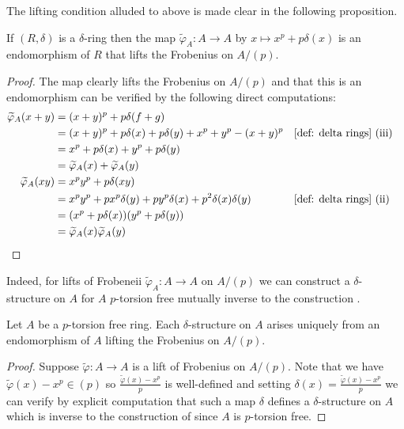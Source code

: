 The lifting condition alluded to above is made clear in the following proposition. 
\begin{proposition}\label{prop: delta structures and Frobenius lifts}
    If $(R,\delta)$ is a $\delta$-ring then the map $\widetilde{\varphi}_{A}:A\to A$ by $x\mapsto x^{p}+p\delta(x)$ is an endomorphism of $R$ that lifts the Frobenius on $A/(p)$. 
\end{proposition}
\begin{proof}
    The map clearly lifts the Frobenius on $A/(p)$ and that this is an endomorphism can be verified by the following direct computations:
    \begin{align*}
        \widetilde{\varphi}_{A}(x+y) &= (x+y)^{p} + p\delta(f+g) \\
        &= (x+y)^{p}+p\delta(x)+p\delta(y)+x^{p}+y^{p}-(x+y)^{p} && \text{\Cref{def: delta rings} (iii)} \\
        &= x^{p}+p\delta(x) + y^{p}+p\delta(y) \\
        &= \widetilde{\varphi}_{A}(x) + \widetilde{\varphi}_{A}(y) \\
        \widetilde{\varphi}_{A}(xy) &= x^{p}y^{p}+p\delta(xy) \\
        &= x^{p}y^{p}+px^{p}\delta(y)+py^{p}\delta(x)+p^{2}\delta(x)\delta(y) && \text{\Cref{def: delta rings} (ii)} \\
        &= (x^{p}+p\delta(x))(y^{p}+p\delta(y)) \\
        &= \widetilde{\varphi}_{A}(x)\widetilde{\varphi}_{A}(y)
    \end{align*}
\end{proof}
Indeed, for lifts of Frobeneii $\widetilde{\varphi}_{A}:A\to A$ on $A/(p)$ we can construct a $\delta$-structure on $A$ for $A$ $p$-torsion free mutually inverse to the construction . 
\begin{proposition}\label{prop: delta structure for Frobenius lifts on p torsion free}
    Let $A$ be a $p$-torsion free ring. Each $\delta$-structure on $A$ arises uniquely from an endomorphism of $A$ lifting the Frobenius on $A/(p)$. 
\end{proposition}
\begin{proof}
    Suppose $\widetilde{\varphi}:A\to A$ is a lift of Frobenius on $A/(p)$. Note that we have $\widetilde{\varphi}(x)-x^{p}\in (p)$ so $\frac{\widetilde{\varphi}(x)-x^{p}}{p}$ is well-defined and setting $\delta(x)=\frac{\widetilde{\varphi}(x)-x^{p}}{p}$ we can verify by explicit computation that such a map $\delta$ defines a $\delta$-structure on $A$ which is inverse to the construction of  since $A$ is $p$-torsion free. 
\end{proof}

